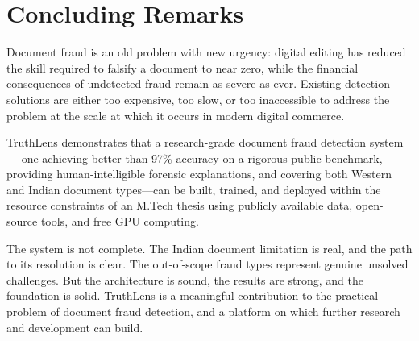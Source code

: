 \documentclass[12pt,a4paper,oneside]{report}
\begin{document}
\section{Concluding Remarks}

Document fraud is an old problem with new urgency: digital editing has reduced
the skill required to falsify a document to near zero, while the financial
consequences of undetected fraud remain as severe as ever. Existing detection
solutions are either too expensive, too slow, or too inaccessible to address
the problem at the scale at which it occurs in modern digital commerce.

TruthLens demonstrates that a research-grade document fraud detection system---
one achieving better than 97\% accuracy on a rigorous public benchmark, providing
human-intelligible forensic explanations, and covering both Western and Indian
document types---can be built, trained, and deployed within the resource
constraints of an M.Tech thesis using publicly available data, open-source tools,
and free GPU computing.

The system is not complete. The Indian document limitation is real, and the
path to its resolution is clear. The out-of-scope fraud types represent genuine
unsolved challenges. But the architecture is sound, the results are strong, and
the foundation is solid. TruthLens is a meaningful contribution to the practical
problem of document fraud detection, and a platform on which further research
and development can build.
\end{document}

